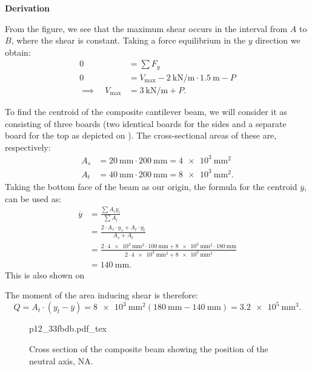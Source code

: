 \documentclass[a4paper]{article}
\newcommand{\incfig}[2][1]{%
  \def\svgwidth{#1\columnwidth}
  {#2.pdf_tex}
}
\numberwithin{equation}{problem}
\newcommand{\AUheading}[1]{%
  \par\vspace{.4\baselineskip}%
  {\sffamily\bfseries\color{AUblueDark}#1\par}%
  \nobreak%
}
\newenvironment{derivation}[1][Derivation]{%
  \AUheading{#1}
  \begingroup\allowdisplaybreaks
  \setlength{\abovedisplayskip}{6pt}%
  \setlength{\belowdisplayskip}{6pt}%
  \setlength{\abovedisplayshortskip}{4pt}%
  \setlength{\belowdisplayshortskip}{4pt}%
}{\par\endgroup\medskip}
\begin{document}
\begin{derivation}
  From the figure, we see that the maximum shear occurs in the interval from $A$ to $B$, where the shear is constant.
  Taking a force equilibrium in the $y$ direction we obtain:
  \begin{align*}
    0 &= \sum F_y \\
    0 &= V_{\mathrm{max}} - \qty{2}{\kN\per\m} \cdot \qty{1,5}{\m} - P  \\
    \implies \quad V_{\mathrm{max}} &= \qty{3}{\kN\per\m} + P
  .\end{align*}

  To find the centroid of the composite cantilever beam, we will consider it as consisting of three boards (two identical boards for the sides and a separate board for the top as depicted on ).
  The cross-sectional areas of these are, respectively:
  \begin{align*}
    A_{s} &= \qty{20}{\mm} \cdot \qty{200}{\mm} = \qty{4e3}{\mm^2} \\
    A_{t} &= \qty{40}{\mm} \cdot \qty{200}{\mm} = \qty{8e3}{\mm^2} 
  .\end{align*}
  Taking the bottom face of the beam as our origin, the formula for the centroid $\overline{y}$, can be used as:
  \begin{align*}
    \overline{y} &= \frac{\sum A_i y_i}{\sum A_i} \\
    &= \frac{2 \cdot A_s \cdot y_s + A_t \cdot y_t}{A_s + A_t} \\
    &= \frac{2 \cdot \qty{4e3}{\mm^2} \cdot \qty{100}{\mm} + \qty{8e3}{\mm^2} \cdot \qty{180}{\mm} }{2 \cdot \qty{4e3}{\mm^2} + \qty{8e3}{\mm^2} } \\
    &= \qty{140}{\mm} 
  .\end{align*}
  This is also shown on 

  The moment of the area inducing shear is therefore:
  \begin{equation*}
    Q = A_t \cdot (y_t - \overline{y}) = \qty{8e3}{\mm^2} \left( \qty{180}{\mm} - \qty{140}{\mm}  \right) = \qty{3,2e5}{\mm^3} 
  .\end{equation*}

\begin{figure}[ht]
    \centering
    \incfig{p12_33fbdb}
    \caption{Cross section of the composite beam showing the position of the neutral axis, NA.}
    \label{fig:p12_33fbdb}
\end{figure}


\end{derivation}
\end{document}
